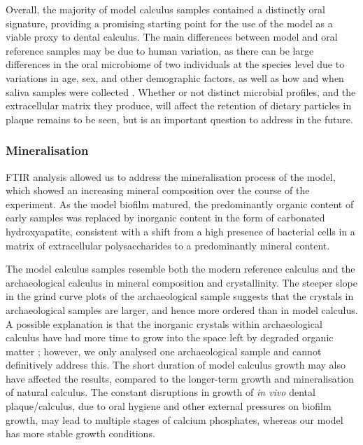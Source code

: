 \documentclass[10pt,a4paper]{article}
\begin{document}
Overall, the majority of model calculus samples contained a distinctly
oral signature, providing a promising starting point for the use of the
model as a viable proxy to dental calculus. The main differences between
model and oral reference samples may be due to human variation, as there
can be large differences in the oral microbiome of two individuals at
the species level due to variations in age, sex, and other demographic
factors, as well as how and when saliva samples were collected
\citep{burchamPatternsOral2020, nearingAssessingVariation2020}. Whether
or not distinct microbial profiles, and the extracellular matrix they
produce, will affect the retention of dietary particles in plaque
remains to be seen, but is an important question to address in the
future.

\subsubsection*{Mineralisation}\label{mineralisation}

FTIR analysis allowed us to address the mineralisation process of the
model, which showed an increasing mineral composition over the course of
the experiment. As the model biofilm matured, the predominantly organic
content of early samples was replaced by inorganic content in the form
of carbonated hydroxyapatite, consistent with a shift from a high
presence of bacterial cells in a matrix of extracellular polysaccharides
\citep{jainIsolationCharacterization2013, sutherlandBiofilmMatrix2001, zhangMeasurementPolysaccharides1998}
to a predominantly mineral content.

The model calculus samples resemble both the modern reference calculus
and the archaeological calculus in mineral composition and
crystallinity. The steeper slope in the grind curve plots of the
archaeological sample suggests that the crystals in archaeological
samples are larger, and hence more ordered than in model calculus. A
possible explanation is that the inorganic crystals within
archaeological calculus have had more time to grow into the space left
by degraded organic matter \citep{weinerBiologicalMaterials2010};
however, we only analysed one archaeological sample and cannot
definitively address this. The short duration of model calculus growth
may also have affected the results, compared to the longer-term growth
and mineralisation of natural calculus. The constant disruptions in
growth of \emph{in vivo} dental plaque/calculus, due to oral hygiene and
other external pressures on biofilm growth, may lead to multiple stages
of calcium phosphates, whereas our model has more stable growth
conditions.
\end{document}
